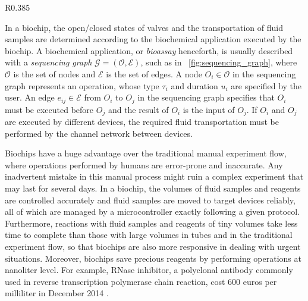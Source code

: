 \begin{wrapfigure}[15]{R}{0.385\textwidth}
{
\vskip -5pt
\figurefontsize
\centering

\caption{Sequencing graph of a bioassay.}
\label{fig:sequencing_graph}
}
\end{wrapfigure}

In a biochip, the open/closed states of valves and the transportation of
fluid samples are determined according to the biochemical application executed by the
biochip. A biochemical application, or \textit{bioassay} henceforth,  
is usually described with
a \textit{sequencing graph} $\mathcal{G}=(\mathcal{O},\mathcal{E})$, such as in
\figname~\ref{fig:sequencing_graph}, where $\mathcal{O}$ is
the set of nodes %
and $\mathcal{E}$ is the set of edges. %
A node $O_i \in \mathcal{O}$ in the sequencing graph
represents an operation, whose type $\tau_i$ and duration $u_i$ are specified by the user.
An edge $e_{ij}\in \mathcal{E}$ from $O_i$ to $O_j$
in the sequencing graph specifies that $O_i$ must be executed before $O_j$ and the 
result of $O_i$ is the input of $O_j$. If $O_i$ and $O_j$ are executed by
different devices, the required fluid transportation must be performed by the channel
network between devices. 

Biochips have a huge advantage over the traditional manual experiment
flow, where operations performed by humans are error-prone 
and inaccurate.  Any inadvertent mistake in this manual process 
might ruin a complex experiment that may
last for several days. In a biochip, the volumes of fluid samples and reagents are
controlled accurately and fluid samples are moved to target devices reliably,
all of which are managed
by a microcontroller exactly following a
given protocol.
Furthermore, reactions with fluid samples and reagents of tiny volumes
take less time to complete than those with large volumes in tubes and
in the traditional experiment flow, so that biochips are also more
responsive in dealing with urgent situations.
Moreover, %
biochips save precious reagents by performing operations at
nanoliter level. %
For example, RNase inhibitor, a polyclonal antibody
commonly used in reverse transcription polymerase chain reaction, cost 600 euros per milliliter in December 2014 
\cite{RNasePrice}. 

